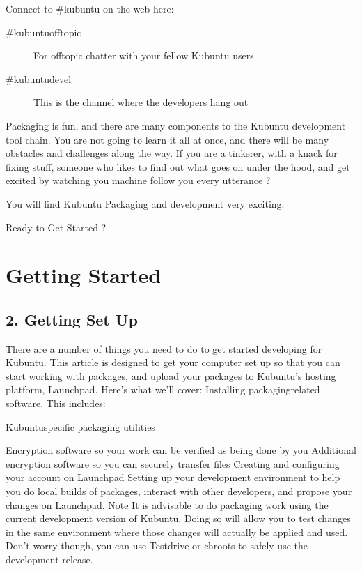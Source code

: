 \documentclass[letterpaper,10pt,english]{sphinxmanual}
\begin{document}
\sphinxAtStartPar
Connect to \#kubuntu on the web here: 
\begin{description}
\item[{\#kubuntu\sphinxhyphen{}offtopic}] \leavevmode
\sphinxAtStartPar
For off\sphinxhyphen{}topic chatter with your fellow Kubuntu users

\item[{\#kubuntu\sphinxhyphen{}devel}] \leavevmode
\sphinxAtStartPar
This is the channel where the developers hang out

\end{description}

\sphinxAtStartPar
Packaging is fun, and there are many components to the Kubuntu development tool chain. You are not going to learn it all at once, and there will be many obstacles and challenges along the way.
If you are a tinkerer, with a knack for fixing stuff, someone who likes to find out what goes on under the hood, and get excited by watching you machine follow you every utterance ?

\sphinxAtStartPar
You will find Kubuntu Packaging and development very exciting.

\sphinxAtStartPar
Ready to Get Started ?


\section{Getting Started}
\label{\detokenize{docs/packaging-guide/getting-started:getting-started}}\label{\detokenize{docs/packaging-guide/getting-started::doc}}

\subsection{2. Getting Set Up}
\label{\detokenize{docs/packaging-guide/getting-started:getting-set-up}}
\sphinxAtStartPar
There are a number of things you need to do to get started developing for Kubuntu. This article is designed to get your computer set up so that you can start working with packages, and upload your packages to Kubuntu’s hosting platform, Launchpad. Here’s what we’ll cover:
Installing packaging\sphinxhyphen{}related software. This includes:

\sphinxAtStartPar
Kubuntu\sphinxhyphen{}specific packaging utilities

\sphinxAtStartPar
Encryption software so your work can be verified as being done by you
Additional encryption software so you can securely transfer files
Creating and configuring your account on Launchpad
Setting up your development environment to help you do local builds of packages, interact with other developers, and propose your changes on Launchpad.
Note
It is advisable to do packaging work using the current development version of Kubuntu. Doing so will allow you to test changes in the same environment where those changes will actually be applied and used.
Don’t worry though, you can use Testdrive or chroots to safely use the development release.
\end{document}
